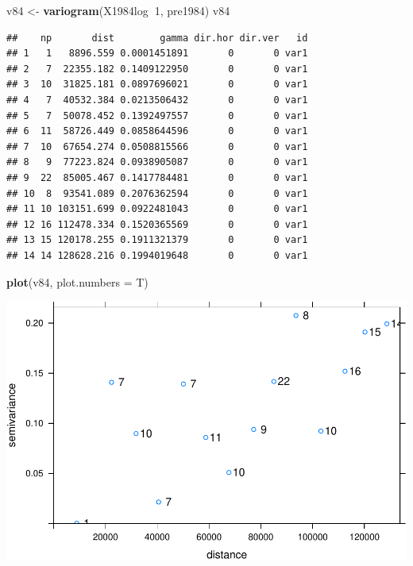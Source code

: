 \documentclass[11pt,]{article}
\newenvironment{Shaded}{\begin{snugshade}}{\end{snugshade}}
\newcommand{\KeywordTok}[1]{\textcolor[rgb]{0.13,0.29,0.53}{\textbf{#1}}}
\newcommand{\DataTypeTok}[1]{\textcolor[rgb]{0.13,0.29,0.53}{#1}}
\newcommand{\DecValTok}[1]{\textcolor[rgb]{0.00,0.00,0.81}{#1}}
\newcommand{\StringTok}[1]{\textcolor[rgb]{0.31,0.60,0.02}{#1}}
\newcommand{\OperatorTok}[1]{\textcolor[rgb]{0.81,0.36,0.00}{\textbf{#1}}}
\newcommand{\NormalTok}[1]{#1}
\begin{document}
\begin{Shaded}
\begin{Highlighting}[]
\NormalTok{v84 <-}\StringTok{ }\KeywordTok{variogram}\NormalTok{(X1984log}\OperatorTok{~}\DecValTok{1}\NormalTok{, pre1984)}
\NormalTok{v84}
\end{Highlighting}
\end{Shaded}

\begin{verbatim}
##    np       dist        gamma dir.hor dir.ver   id
## 1   1   8896.559 0.0001451891       0       0 var1
## 2   7  22355.182 0.1409122950       0       0 var1
## 3  10  31825.181 0.0897696021       0       0 var1
## 4   7  40532.384 0.0213506432       0       0 var1
## 5   7  50078.452 0.1392497557       0       0 var1
## 6  11  58726.449 0.0858644596       0       0 var1
## 7  10  67654.274 0.0508815566       0       0 var1
## 8   9  77223.824 0.0938905087       0       0 var1
## 9  22  85005.467 0.1417784481       0       0 var1
## 10  8  93541.089 0.2076362594       0       0 var1
## 11 10 103151.699 0.0922481043       0       0 var1
## 12 16 112478.334 0.1520365569       0       0 var1
## 13 15 120178.255 0.1911321379       0       0 var1
## 14 14 128628.216 0.1994019648       0       0 var1
\end{verbatim}

\begin{Shaded}
\begin{Highlighting}[]
\KeywordTok{plot}\NormalTok{(v84, }\DataTypeTok{plot.numbers =}\NormalTok{ T)}
\end{Highlighting}
\end{Shaded}

\includegraphics{proyecto_files/figure-latex/unnamed-chunk-35-1.pdf}
\end{document}
